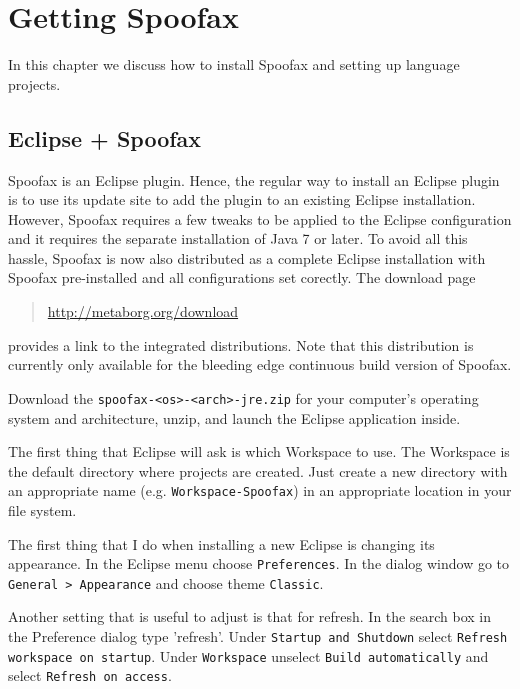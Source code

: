 \chapter{Getting Spoofax}

In this chapter we discuss how to install Spoofax and setting up language
projects.

\section{Eclipse + Spoofax}

Spoofax is an Eclipse plugin. Hence, the regular way to install an Eclipse
plugin is to use its update site to add the plugin to an existing Eclipse
installation. However, Spoofax requires a few tweaks to be applied to the
Eclipse configuration and it requires the separate installation of Java 7 or
later. To avoid all this hassle, Spoofax is now also distributed as a
complete Eclipse installation with Spoofax pre-installed and all configurations
set corectly. The download page

\begin{quote}
  \url{http://metaborg.org/download}
\end{quote}

\noindent
provides a link to the integrated distributions. Note that this distribution is
currently only available for the bleeding edge continuous build version of
Spoofax. 

Download the \texttt{spoofax-<os>-<arch>-jre.zip} for your computer's operating
 system and architecture, unzip, and launch the Eclipse application inside.
 
The first thing that Eclipse will ask is which Workspace to use. The Workspace
is the default directory where projects are created. Just create a new directory
with an appropriate name (e.g. \texttt{Workspace-Spoofax}) in an appropriate
location in your file system.

The first thing that I do when installing a new Eclipse is changing its
appearance. In the Eclipse menu choose \texttt{Preferences}. In the dialog
window go to \texttt{General > Appearance} and choose theme \texttt{Classic}. 

Another setting that is useful to adjust is that for refresh. In the search 
box in the Preference dialog type 'refresh'. Under \texttt{Startup and Shutdown} 
select \texttt{Refresh workspace on startup}. Under \texttt{Workspace} unselect
\texttt{Build automatically} and select \texttt{Refresh on access}.

